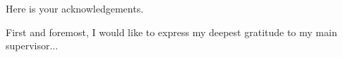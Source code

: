 Here is your acknowledgements.

First and foremost, I would like to express my deepest gratitude to my main supervisor...
